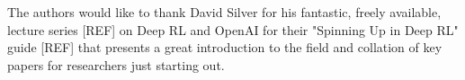 \documentclass[10pt,journal,compsoc]{IEEEtran}
\begin{document}
The authors would like to thank David Silver for his fantastic, freely available, lecture series [REF] on Deep RL and OpenAI for their "Spinning Up in Deep RL" guide [REF] that presents a great introduction to the field and collation of key papers for researchers just starting out. 


\ifCLASSOPTIONcaptionsoff
  \newpage
\fi





%
%
%

 
\end{document}
